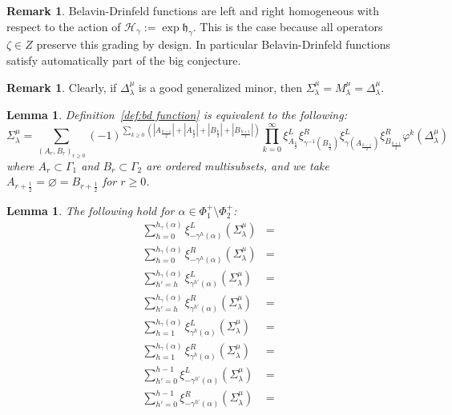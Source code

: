 \documentclass[a4paper]{amsart}
\newtheorem{lemma}[theorem]{Lemma}
\theoremstyle{definition}
\newtheorem{remark}[theorem]{Remark}
\newcommand{\mfh}{\mathfrak{h}}
\newcommand{\mcH}{\mathcal{H}}
\begin{document}
\begin{remark}
  Belavin-Drinfeld functions are left and right homogeneous with respect to the action of $\mcH_\gamma:=\exp\mfh_\gamma$.
  This is the case because all operators $\zeta\in Z$ preserve this grading by design.
  In particular Belavin-Drinfeld functions satisfy automatically part of the big conjecture.
\end{remark}

\begin{remark}
  Clearly, if $\Delta_\lambda^\mu$ is a good generalized minor, then $\Sigma_\lambda^\mu=M_\lambda^\mu=\Delta_\lambda^\mu$.
\end{remark}

\begin{lemma}
  Definition~\ref{def:bd function} is equivalent to the following:
  \begin{equation}
    \Sigma_\lambda^\mu
    =
    \sum_{(A_r,B_r)_{r\ge0}} (-1)^{\sum_{k\ge0} (|A_{\frac{k-1}{2}}|+|A_{\frac{k}{2}}|+|B_{\frac{k}{2}}|+|B_{\frac{k+1}{2}}|)}
    \prod_{k=0}^\infty \xi^L_{A_{\frac{k}{2}}} \xi^R_{\gamma^{-1}(B_{\frac{k}{2}})} \xi^L_{\gamma(A_{\frac{k-1}{2}})} \xi^R_{B_{\frac{k+1}{2}}} \varphi^k(\Delta_\lambda^\mu)
  \end{equation}
  where $A_r\subset\Gamma_1$ and $B_r\subset\Gamma_2$ are ordered multisubsets, and we take $A_{r+\frac{1}{2}}=\varnothing=B_{r+\frac{1}{2}}$ for $r\ge0$.
\end{lemma}

\begin{lemma}
  The following hold for $\alpha\in\Phi_1^+\setminus\Phi_2^+$:
  \begin{align*}
    \sum_{h=0}^{h_\gamma(\alpha)} \xi^L_{-\gamma^h(\alpha)}(\Sigma_\lambda^\mu)
    &=\\
    \sum_{h=0}^{h_\gamma(\alpha)} \xi^R_{-\gamma^h(\alpha)}(\Sigma_\lambda^\mu)
    &=\\
    \sum_{h'=h}^{h_\gamma(\alpha)} \xi^L_{\gamma^{h'}(\alpha)}(\Sigma_\lambda^\mu)
    &=\\
    \sum_{h'=h}^{h_\gamma(\alpha)} \xi^R_{\gamma^{h'}(\alpha)}(\Sigma_\lambda^\mu)
    &=\\
    \sum_{h=1}^{h_\gamma(\alpha)} \xi^L_{\gamma^h(\alpha)}(\Sigma_\lambda^\mu)
    &=\\
    \sum_{h=1}^{h_\gamma(\alpha)} \xi^R_{\gamma^h(\alpha)}(\Sigma_\lambda^\mu)
    &=\\
    \sum_{h'=0}^{h-1} \xi^L_{-\gamma^{h'}(\alpha)}(\Sigma_\lambda^\mu)
    &=\\
    \sum_{h'=0}^{h-1} \xi^R_{-\gamma^{h'}(\alpha)}(\Sigma_\lambda^\mu)
    &=\\
  \end{align*}
\end{lemma}
\end{document}
